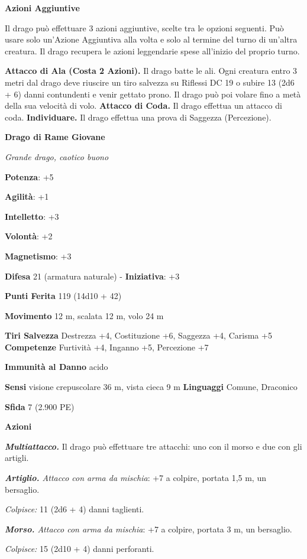 \begin{multicols}{2}
\textbf{Azioni Aggiuntive}

Il drago può effettuare 3 azioni aggiuntive, scelte tra le opzioni
seguenti. Può usare solo un'Azione Aggiuntiva alla volta e solo al
termine del turno di un'altra creatura. Il drago recupera le azioni
leggendarie spese all'inizio del proprio turno.

\textbf{Attacco di Ala (Costa 2 Azioni).} Il drago batte le ali. Ogni
creatura entro 3 metri dal drago deve riuscire un tiro salvezza su Riflessi DC 19 o subire 13 (2d6 + 6) danni contundenti e venir gettato
prono. Il drago può poi volare fino a metà della sua velocità di volo.
\textbf{Attacco di Coda.} Il drago effettua un attacco di coda.
\textbf{Individuare.} Il drago effettua una prova di Saggezza
(Percezione).

\textbf{Drago di Rame Giovane}

\emph{Grande drago, caotico buono}

\textbf{Potenza}: +5

\textbf{Agilità}: +1

\textbf{Intelletto}: +3

\textbf{Volontà}: +2

\textbf{Magnetismo}: +3

\textbf{Difesa} 21 (armatura naturale) - \textbf{Iniziativa}: +3

\textbf{Punti Ferita} 119 (14d10 + 42)

\textbf{Movimento} 12 m, scalata 12 m, volo 24 m

\textbf{Tiri Salvezza} Destrezza +4, Costituzione +6, Saggezza +4,
Carisma +5 \textbf{Competenze} Furtività +4, Inganno +5, Percezione +7

\textbf{Immunità al Danno} acido

\textbf{Sensi} visione crepuscolare 36 m, vista cieca 9 m
\textbf{Linguaggi} Comune, Draconico

\textbf{Sfida} 7 (2.900 PE)

\textbf{Azioni}

\emph{\textbf{Multiattacco.}} Il drago può effettuare tre attacchi: uno
con il morso e due con gli artigli.

\emph{\textbf{Artiglio.} Attacco con arma da mischia}: +7 a colpire,
portata 1,5 m, un bersaglio.

\emph{Colpisce:} 11 (2d6 + 4) danni taglienti.

\emph{\textbf{Morso.} Attacco con arma da mischia}: +7 a colpire,
portata 3 m, un bersaglio.

\emph{Colpisce:} 15 (2d10 + 4) danni perforanti.


\end{multicols}
